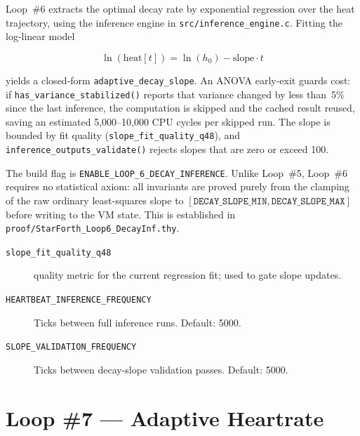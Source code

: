 
Loop~\#6 extracts the optimal decay rate by exponential regression over the
heat trajectory, using the inference engine in \texttt{src/inference\_engine.c}.
Fitting the log-linear model

\begin{equation}
  \ln(\mathrm{heat}[t]) = \ln(h_0) - \mathrm{slope} \cdot t
\end{equation}

yields a closed-form \texttt{adaptive\_decay\_slope}. An ANOVA early-exit
guards cost: if \texttt{has\_variance\_stabilized()} reports that variance
changed by less than~5\% since the last inference, the computation is skipped
and the cached result reused, saving an estimated 5{,}000--10{,}000 CPU cycles
per skipped run. The slope is bounded by fit quality
(\texttt{slope\_fit\_quality\_q48}), and
\texttt{inference\_outputs\_validate()} rejects slopes that are zero or exceed
100.

The build flag is \texttt{ENABLE\_LOOP\_6\_DECAY\_INFERENCE}. Unlike
Loop~\#5, Loop~\#6 requires no statistical axiom: all invariants are proved
purely from the clamping of the raw ordinary least-squares slope to
$[\texttt{DECAY\_SLOPE\_MIN}, \texttt{DECAY\_SLOPE\_MAX}]$ before writing to
the VM state. This is established in \texttt{proof/StarForth\_Loop6\_DecayInf.thy}.

\begin{description}
  \item[\texttt{slope\_fit\_quality\_q48}] \Qtype{} quality metric for the
    current regression fit; used to gate slope updates.
  \item[\texttt{HEARTBEAT\_INFERENCE\_FREQUENCY}] Ticks between full inference
    runs. Default: 5000.
  \item[\texttt{SLOPE\_VALIDATION\_FREQUENCY}] Ticks between decay-slope
    validation passes. Default: 5000.
\end{description}

\section{Loop \#7 --- Adaptive Heartrate}
\label{vol1:sec:physics:loop7}


